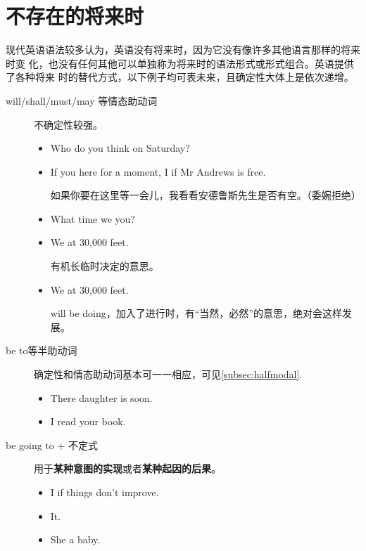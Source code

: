 \section{不存在的将来时}

现代英语语法较多认为，英语没有将来时，因为它没有像许多其他语言那样的将来时变
化，也没有任何其他可以单独称为将来时的语法形式或形式组合。英语提供了各种将来
时的替代方式，以下例子均可表未来，且确定性大体上是依次递增。
\begin{description}
\item[will/shall/must/may 等情态助动词] 不确定性较强。

  \begin{itemize}
  \item Who do you think  on Saturday?

  \item If you here for a moment, I if Mr
    Andrews is free.

    如果你要在这里等一会儿，我看看安德鲁斯先生是否有空。（委婉拒绝）
  \item What time  we  you?

  \item We at 30,000 feet.

    有机长临时决定的意思。

  \item We at 30,000 feet.

    will be doing，加入了进行时，有“当然，必然”的意思，绝对会这样发展。
  \end{itemize}
\item[be to等半助动词] 确定性和情态助动词基本可一一相应，可见\cref{subsec:halfmodal}.
  \begin{itemize}
  \item There daughter is  soon.

  \item I read your book.
  \end{itemize}

\item[be going to + 不定式] 用于\textbf{某种意图的实现}或者\textbf{某种起因的后果}。
  \begin{itemize}
  \item I  if things don't improve.
  \item It.

  \item She a baby.
  \end{itemize}


\end{description}
